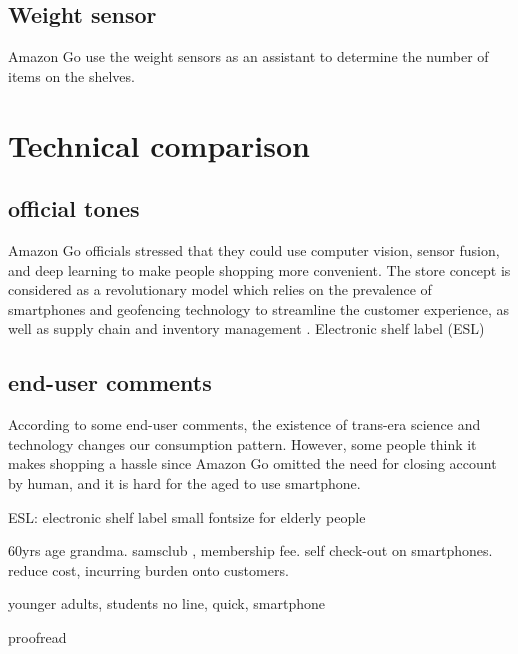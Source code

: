 \subsection{Weight sensor}
Amazon Go use the weight sensors as an assistant to determine the number of items on the shelves.

\section{ Technical comparison }

\subsection{official tones}

Amazon Go officials stressed that they could use computer vision, sensor fusion, and deep learning to make people shopping more convenient.
The store concept is considered as a revolutionary model which relies on the prevalence of smartphones and geofencing technology to streamline the customer experience, as well as supply chain and inventory management\cite{GREWAL20171} .
Electronic shelf label (ESL)


\subsection{end-user comments}

According to some end-user comments, the existence of trans-era science and technology changes our consumption pattern. However, some people think it  makes shopping a hassle since Amazon Go omitted the need for closing account by human, and it is hard for the aged to use smartphone.

ESL: electronic shelf label
small fontsize for elderly people

60yrs age grandma.
samsclub , membership fee.  self check-out on smartphones.  reduce cost, incurring burden onto customers.

younger adults, students
no line, quick, smartphone

proofread
